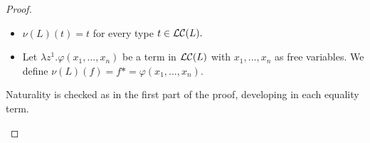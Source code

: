 \begin{proof}
\begin{enumerate}
    \begin{itemize}
    \item  $\nu(L)(t) = t$ for every type $t \in \mathcal{L}\mathcal{C}(L).$
    \item  Let $\lambda z^1.\varphi(x_1,...,x_n)$ be a term in $\mathcal{L}\mathcal{C}(L)$ with $x_1,...,x_n$ as free variables. We define $\nu(L)(f)= f* = \varphi(x_1,...,x_n)$.  
    \end{itemize}

    Naturality is checked as in the first part of the proof, developing in each equality term. 
  \end{enumerate}
\end{proof}







